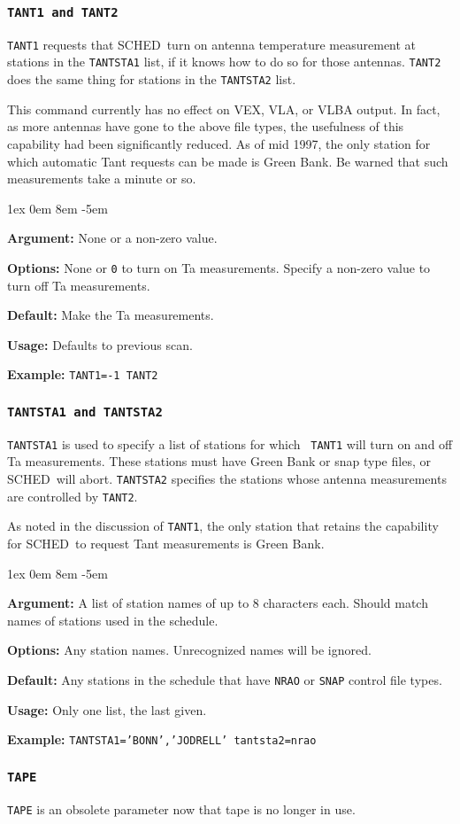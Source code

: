 \documentclass{report}
\newcommand{\schedb}{{\sc SCHED~}}
\newcommand{\rcwbox}[5]{
  \begin{list}{}{\parsep 1ex  \itemsep 0em
                 \leftmargin 8em  \itemindent -5em }
    \item {\bf Argument:} #1
    \item {\bf Options:}  #2
    \item {\bf Default:}  #3
    \item {\bf Usage:}    #4
    \item {\bf Example:}  #5
  \end{list}
}
\begin{document}
\subsubsection{\label{MP:TANT1}{\tt TANT1 and TANT2}}

{\tt TANT1} requests that \schedb turn on antenna temperature
measurement at stations in the {\tt TANTSTA1} list, if it knows
how to do so for those antennas.   {\tt TANT2} does the same thing
for stations in the {\tt TANTSTA2} list.

This command currently has no effect on VEX, VLA, or VLBA output.
In fact, as more antennas have gone to the above file types, the
usefulness of this capability had been significantly reduced.
As of mid 1997, the only station for which automatic Tant requests
can be made is Green Bank.  Be warned that such measurements take
a minute or so.

\rcwbox
{None or a non-zero value.}
{None or {\tt 0} to turn on Ta measurements. Specify a non-zero
value to turn off Ta measurements.}
{Make the Ta measurements.}
{Defaults to previous scan.}
{{\tt TANT1=-1  TANT2 }}


\subsubsection{\label{MP:TANTSTA1}{\tt TANTSTA1 and TANTSTA2}}

{\tt TANTSTA1} is used to specify a list of stations for which {\tt
TANT1} will turn on and off Ta measurements. These stations must have
Green Bank or snap type files, or \schedb will abort.
{\tt TANTSTA2} specifies the stations whose antenna measurements
are controlled by {\tt TANT2}.

As noted in the discussion of {\tt TANT1}, the only station that
retains the capability for \schedb to request Tant measurements is
Green Bank.

\rcwbox
{A list of station names of up to 8 characters each. Should match names
of stations used in the schedule.}
{Any station names. Unrecognized names will be ignored.}
{Any stations in the schedule that have {\tt NRAO} or {\tt SNAP}
control file types.}
{Only one list, the last given.}
{{\tt TANTSTA1='BONN','JODRELL'  tantsta2=nrao}}


\subsubsection{\label{MP:TAPE}{\tt TAPE}}

{\tt TAPE} is an obsolete parameter now that tape is no longer in use.
\end{document}
